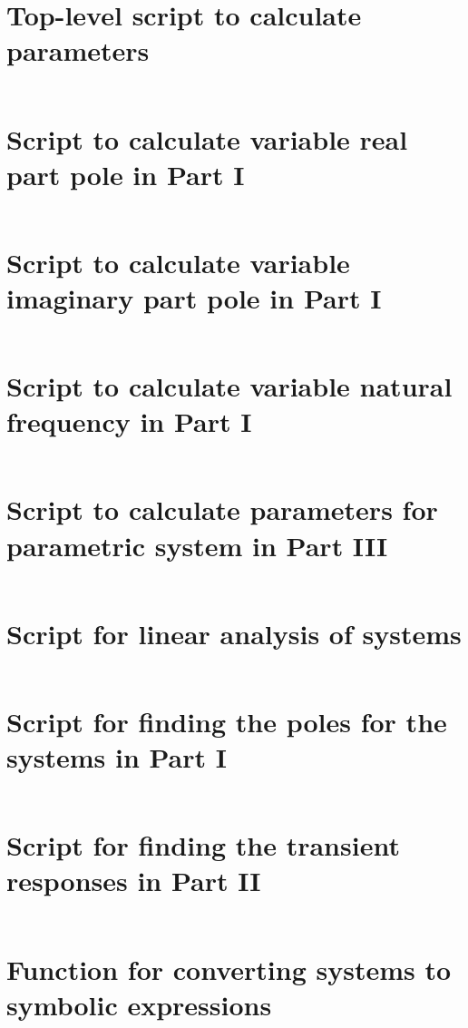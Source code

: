 \documentclass[11pt]{article}
\begin{document}
\section{Top-level script to calculate parameters}\label{apx:top param}
\inputminted{matlab}{lab0405/programs/time_response_params_m1.m}

\section{Script to calculate variable real part pole in Part I}
\inputminted{matlab}{lab0405/programs/part0102_reals_m1.m}

\section{Script to calculate variable imaginary part pole in Part I}
\inputminted{matlab}{lab0405/programs/part0103_imags_m1.m}

\section{Script to calculate variable natural frequency in Part I}
\inputminted{matlab}{lab0405/programs/part0104_nat_freqs_m1.m}

\section{Script to calculate parameters for parametric system in Part III}\label{apx:last param}
\inputminted{matlab}{lab0405/programs/part03_params_m1.m}

\section{Script for linear analysis of systems}\label{apx:linear analysis}
\inputminted{matlab}{lab0405/programs/lin_analysis_m1.m}

\section{Script for finding the poles for the systems in Part I}\label{apx:part 01 pz map}
\inputminted{matlab}{lab0405/programs/part01_poles_zeros_m1.m}

\section{Script for finding the transient responses in Part II}\label{apx:part 03 transient responses}
\inputminted{matlab}{lab0405/programs/part02_transient_response_m1.m}

\section{Function for converting systems to symbolic expressions}\label{apx:sys2sym}
\inputminted{matlab}{lab0405/programs/sys2sym.m}
\end{document}
